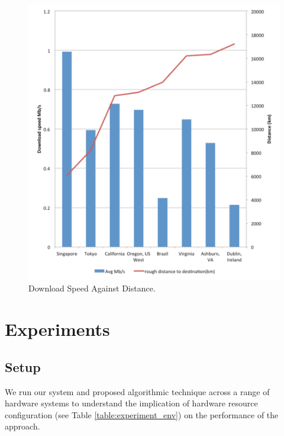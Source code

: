 \begin{figure}[!ht]
 \centering
 \includegraphics[width=\textwidth,keepaspectratio]{Figures/QoS/figure6.pdf}
 \caption{Download Speed Against Distance.}
\label{fig:DownloadSpeedAgainstDistance}
\end{figure}

\section{Experiments}
\subsection{Setup}
We run our system and proposed algorithmic technique across a range of hardware systems to understand the implication of hardware resource configuration (see Table \ref{table:experiment_env}) on the performance of the approach.

